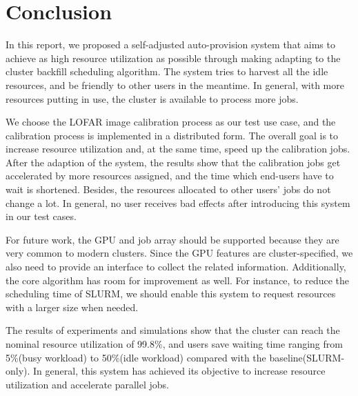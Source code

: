 
\chapter{Conclusion} %





% 



In this report, we proposed a self-adjusted auto-provision system that aims to achieve as high resource utilization as possible through making adapting to the cluster backfill scheduling algorithm. 
The system tries to harvest all the idle resources, and be friendly to other users in the meantime. 
In general, with more resources putting in use, the cluster is available to process more jobs.

We choose the LOFAR image calibration process as our test use case, and the calibration process is implemented in a distributed form. 
The overall goal is to increase resource utilization and, at the same time, speed up the calibration jobs. 
After the adaption of the system, the results show that the calibration jobs get accelerated by more resources assigned, and the time which end-users have to wait is shortened. 
Besides, the resources allocated to other users’ jobs do not change a lot. 
In general, no user receives bad effects after introducing this system in our test cases.

For future work, the GPU and job array should be supported because they are very common to modern clusters. 
Since the GPU features are cluster-specified, we also need to provide an interface to collect the related information. 
Additionally, the core algorithm has room for improvement as well. 
For instance, to reduce the scheduling time of SLURM, we should enable this system to request resources with a larger size when needed.

The results of experiments and simulations show that the cluster can reach the nominal resource utilization of 99.8\%, and users save waiting time ranging from  5\%(busy workload) to 50\%(idle workload) compared with the baseline(SLURM-only). 
In general, this system has achieved its objective to increase resource utilization and accelerate parallel jobs.

